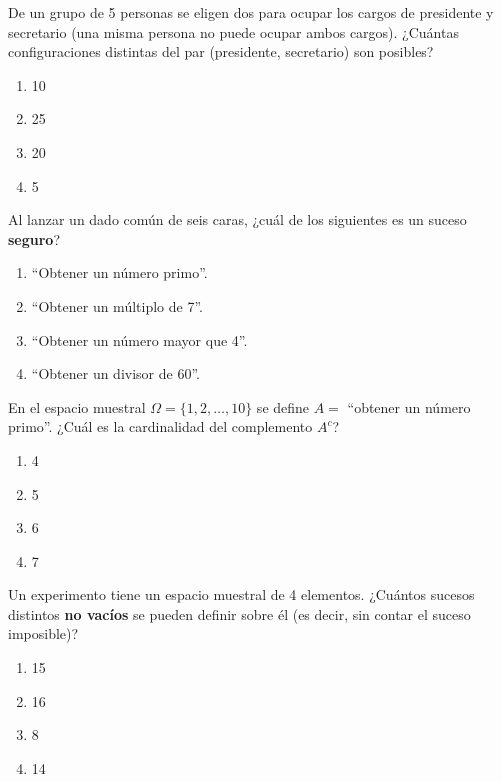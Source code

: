 \documentclass[12pt, a4paper]{article} %
\begin{document}
\begin{enumerate}[leftmargin=*]
    \begin{minipage}{\linewidth}
    \item De un grupo de 5 personas se eligen dos para ocupar los cargos de presidente y secretario (una misma persona no puede ocupar ambos cargos). ¿Cuántas configuraciones distintas del par (presidente, secretario) son posibles?
    \begin{enumerate}
        \item 10
        \item 25
        \item 20
        \item 5
    \end{enumerate}
    \end{minipage}
    \vspace{0.5cm}

    \begin{minipage}{\linewidth}
    \item Al lanzar un dado común de seis caras, ¿cuál de los siguientes es un suceso \textbf{seguro}?
    \begin{enumerate}
        \item ``Obtener un número primo''.
        \item ``Obtener un múltiplo de 7''.
        \item ``Obtener un número mayor que 4''.
        \item ``Obtener un divisor de 60''.
    \end{enumerate}
    \end{minipage}
    \vspace{0.5cm}

    \begin{minipage}{\linewidth}
    \item En el espacio muestral $\Omega = \{1, 2, \dots, 10\}$ se define $A = $ ``obtener un número primo''. ¿Cuál es la cardinalidad del complemento $A^c$?
    \begin{enumerate}
        \item 4
        \item 5
        \item 6
        \item 7
    \end{enumerate}
    \end{minipage}
    \vspace{0.5cm}

    \begin{minipage}{\linewidth}
    \item Un experimento tiene un espacio muestral de 4 elementos. ¿Cuántos sucesos distintos \textbf{no vacíos} se pueden definir sobre él (es decir, sin contar el suceso imposible)?
    \begin{enumerate}
        \item 15
        \item 16
        \item 8
        \item 14
    \end{enumerate}
    \end{minipage}
    \vspace{0.5cm}


\end{enumerate}
\end{document}
